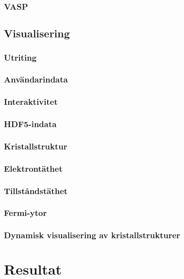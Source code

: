 \documentclass[a4paper,12pt]{article}
\begin{document}
\subsubsection{VASP}



\subsection{Visualisering}
\label{visualisering}
\subsubsection{Utriting}
\subsubsection{Användarindata}
\subsubsection{Interaktivitet}
\subsubsection{HDF5-indata}
\subsubsection{Kristallstruktur}
\subsubsection{Elektrontäthet}
\subsubsection{Tillståndstäthet}
\subsubsection{Fermi-ytor}
\subsubsection{Dynamisk visualisering av kristallstrukturer}

\section{Resultat}
\end{document}
